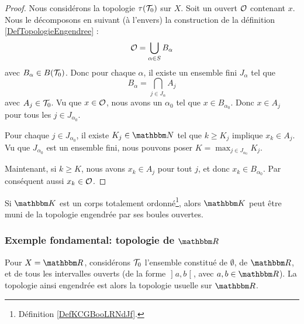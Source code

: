 \begin{proof}
    Nous considérons la topologie \( \tau(\mathcal{T}_0)\) sur \( X\). Soit un ouvert \( \mathcal{O}\) contenant \( x\). Nous le décomposons en suivant (à l'envers) la construction de la définition \ref{DefTopologieEngendree} :
    \begin{equation}
        \mathcal{O}=\bigcup_{\alpha\in S}B_{\alpha}
    \end{equation}
    avec \( B_{\alpha}\in B(\mathcal{T}_0)\). Donc pour chaque \( \alpha\), il existe un ensemble fini \( J_{\alpha}\) tel que
    \begin{equation}
        B_{\alpha}=\bigcap_{j\in J_{\alpha}}A_j
    \end{equation}
    avec \( A_j\in \mathcal{T}_0\). Vu que \( x\in \mathcal{O}\), nous avons un \( \alpha_0\) tel que \( x\in B_{\alpha_0}\). Donc \( x\in A_j\) pour tous les \( j\in J_{\alpha_0}\). 
    
    Pour chaque \( j\in J_{\alpha_0}\), il existe \( K_j\in \eN\) tel que \( k\geq K_j\) implique \( x_k\in A_j\). Vu que \( J_{\alpha_0}\) est un ensemble fini, nous pouvons poser \( K=\max_{j\in J_{\alpha_0}}K_j\).

    Maintenant, si \( k\geq K\), nous avons \( x_k\in A_j\) pour tout \( j\), et donc \( x_k\in B_{\alpha_0}\). Par conséquent aussi \( x_k\in \mathcal{O}\).
\end{proof}


\begin{example}
  Si \( \eK \) est un corps totalement ordonné\footnote{Définition \ref{DefKCGBooLRNdJf}.}, alors \( \eK \) peut être muni de la topologie engendrée par ses boules ouvertes.
\end{example}

\subsubsection{Exemple fondamental: topologie de \texorpdfstring{$\eR$}{R}}
\begin{definition} \label{DefTopologieREngendree}
  Pour \( X = \eR \), considérons \( \mathcal{T}_0 \) l'ensemble constitué de \( \emptyset \), de \( \eR \), et de tous les intervalles ouverts (de la forme \( \mathopen] a, b \mathclose[ \), avec \( a, b \in \eR \)). La topologie ainsi engendrée est alors la topologie usuelle sur \( \eR \).
\end{definition}

